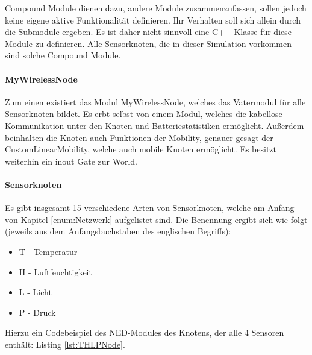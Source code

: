Compound Module dienen dazu, andere Module zusammenzufassen, sollen jedoch keine eigene aktive Funktionalität definieren. Ihr Verhalten soll sich allein durch die Submodule ergeben. Es ist daher nicht sinnvoll eine C++-Klasse für diese Module zu definieren.\newline
Alle Sensorknoten, die in dieser Simulation vorkommen sind solche Compound Module.

\paragraph{MyWirelessNode}

Zum einen existiert das Modul MyWirelessNode, welches das Vatermodul für alle Sensorknoten bildet. Es erbt selbst von einem Modul, welches die kabellose Kommunikation unter den Knoten und Batteriestatistiken ermöglicht. Außerdem beinhalten die Knoten auch Funktionen der Mobility, genauer gesagt der CustomLinearMobility, welche auch mobile Knoten ermöglicht. \newline
Es besitzt weiterhin ein inout Gate zur World.

\paragraph{Sensorknoten}

Es gibt insgesamt 15 verschiedene Arten von Sensorknoten, welche am Anfang von Kapitel \ref{enum:Netzwerk} aufgelistet sind. Die Benennung ergibt sich wie folgt (jeweils aus dem Anfangsbuchstaben des englischen Begriffs):
\begin{itemize}
\item T - Temperatur
\item H - Luftfeuchtigkeit
\item L - Licht
\item P - Druck
\end{itemize}
Hierzu ein Codebeispiel des NED-Modules des Knotens, der alle 4 Sensoren enthält: Listing \ref{lst:THLPNode}.

